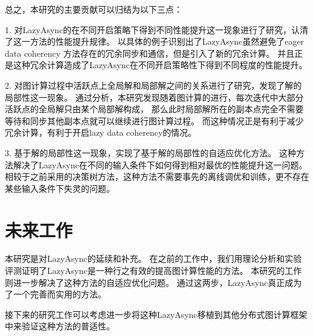 总之，本研究的主要贡献可以归结为以下三点：


1. 对LazyAsync的在不同开启策略下得到不同性能提升这一现象进行了研究，认清了这一方法的性能提升规律。
以具体的例子识别出了LazyAsync虽然避免了eager data coherency 方法存在的冗余同步和通信，但是引入了新的冗余计算。
并且正是这种冗余计算造成了LazyAsync在不同开启策略性下得到不同程度的性能提升。

2. 对图计算过程中活跃点上全局解和局部解之间的关系进行了研究，发现了解的局部性这一现象。
通过分析，本研究发现随着图计算的进行，每次迭代中大部分活跃点的全局解只由某个局部解构成，
那么此时局部解所在的副本点完全不需要等待和同步其他副本点就可以继续进行图计算过程。
而这种情况正是有利于减少冗余计算，有利于开启lazy data coherency的情况。

3. 基于解的局部性这一现象，实现了基于解的局部性的自适应优化方法。
这种方法解决了LazyAsync在不同的输入条件下如何得到相对最优的性能提升这一问题。
相较于之前采用的决策树方法，这种方法不需要事先的离线调优和训练，更不存在某些输入条件下失灵的问题。

\section{未来工作}

本研究是对LazyAsync的延续和补充。
在之前的工作中，我们用理论分析和实验评测证明了LazyAsync是一种行之有效的提高图计算性能的方法。
本研究的工作则进一步解决了这种方法的自适应优化问题。
通过这两步，LazyAsync真正成为了一个完善而实用的方法。

接下来的研究工作可以考虑进一步将这种LazyAsync移植到其他分布式图计算框架中来验证这种方法的普适性。


